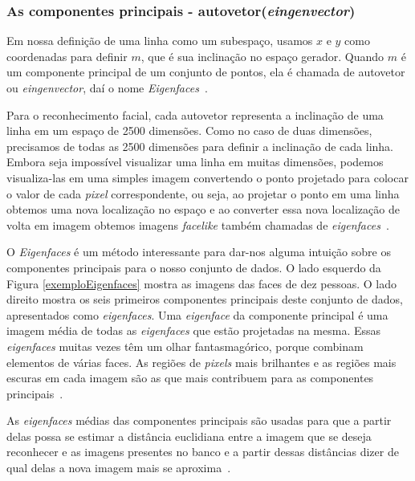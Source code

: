\subsubsection{As componentes principais - autovetor(\textit{eingenvector})}

Em nossa definição de uma linha como um subespaço, usamos $\displaystyle x$ e $\displaystyle y$ como coordenadas para definir $\displaystyle m$, que é sua inclinação no espaço gerador. Quando $\displaystyle m$ é um componente principal de um conjunto de pontos, ela é chamada de autovetor ou \textit{eingenvector}, daí o nome \textit{Eigenfaces}~\cite{hewitt}. 

Para o reconhecimento facial, cada autovetor representa a inclinação de uma linha em um espaço de 2500 dimensões. Como no caso de duas dimensões, precisamos de todas as 2500 dimensões para definir a inclinação de cada linha. Embora seja impossível visualizar uma linha em muitas dimensões, podemos visualiza-las em uma simples imagem convertendo o ponto projetado para colocar o valor de cada \textit{pixel} correspondente, ou seja, ao projetar o ponto em uma linha obtemos uma nova localização no espaço e ao converter essa nova localização de volta em imagem obtemos imagens \textit{facelike} também chamadas de \textit{eigenfaces}~\cite{hewitt,turkpentland}.

O \textit{Eigenfaces} é um método interessante para dar-nos alguma intuição sobre os componentes principais para o nosso conjunto de dados. O lado esquerdo da Figura \ref{exemploEigenfaces} mostra as imagens das faces de dez pessoas. O lado direito  mostra os seis primeiros componentes principais deste conjunto de dados, apresentados como \textit{eigenfaces}. Uma \textit{eigenface} da componente principal é uma imagem média de todas as \textit{eigenfaces} que estão projetadas na mesma. Essas \textit{eigenfaces} muitas vezes têm um olhar fantasmagórico, porque combinam elementos de várias faces. As regiões de \textit{pixels} mais brilhantes e as regiões mais escuras em cada imagem são as que mais contribuem para as componentes principais~\cite{hewitt}. 

As \textit{eigenfaces} médias das componentes principais são usadas para que a partir delas possa se estimar a distância euclidiana entre a imagem que se deseja reconhecer e as imagens presentes no banco e a partir dessas distâncias dizer de qual delas a nova imagem mais se aproxima~\cite{turkpentland}.

